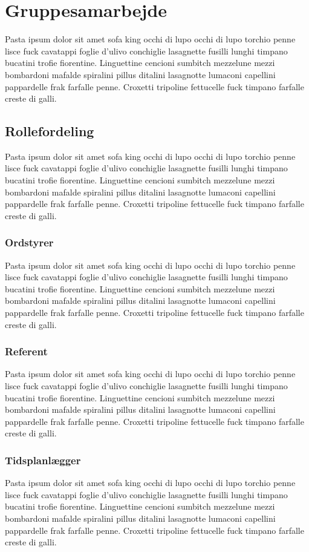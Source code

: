 \chapter{Gruppesamarbejde}
Pasta ipsum dolor sit amet sofa king occhi di lupo occhi di lupo torchio penne lisce fuck cavatappi foglie d'ulivo conchiglie lasagnette fusilli lunghi timpano bucatini trofie fiorentine. Linguettine cencioni sumbitch mezzelune mezzi bombardoni mafalde spiralini pillus ditalini lasagnotte lumaconi capellini pappardelle frak farfalle penne. Croxetti tripoline fettucelle fuck timpano farfalle creste di galli.

\section{Rollefordeling}
Pasta ipsum dolor sit amet sofa king occhi di lupo occhi di lupo torchio penne lisce fuck cavatappi foglie d'ulivo conchiglie lasagnette fusilli lunghi timpano bucatini trofie fiorentine. Linguettine cencioni sumbitch mezzelune mezzi bombardoni mafalde spiralini pillus ditalini lasagnotte lumaconi capellini pappardelle frak farfalle penne. Croxetti tripoline fettucelle fuck timpano farfalle creste di galli.

\subsection{Ordstyrer}
Pasta ipsum dolor sit amet sofa king occhi di lupo occhi di lupo torchio penne lisce fuck cavatappi foglie d'ulivo conchiglie lasagnette fusilli lunghi timpano bucatini trofie fiorentine. Linguettine cencioni sumbitch mezzelune mezzi bombardoni mafalde spiralini pillus ditalini lasagnotte lumaconi capellini pappardelle frak farfalle penne. Croxetti tripoline fettucelle fuck timpano farfalle creste di galli.

\subsection{Referent}
Pasta ipsum dolor sit amet sofa king occhi di lupo occhi di lupo torchio penne lisce fuck cavatappi foglie d'ulivo conchiglie lasagnette fusilli lunghi timpano bucatini trofie fiorentine. Linguettine cencioni sumbitch mezzelune mezzi bombardoni mafalde spiralini pillus ditalini lasagnotte lumaconi capellini pappardelle frak farfalle penne. Croxetti tripoline fettucelle fuck timpano farfalle creste di galli.

\subsection{Tidsplanlægger}
Pasta ipsum dolor sit amet sofa king occhi di lupo occhi di lupo torchio penne lisce fuck cavatappi foglie d'ulivo conchiglie lasagnette fusilli lunghi timpano bucatini trofie fiorentine. Linguettine cencioni sumbitch mezzelune mezzi bombardoni mafalde spiralini pillus ditalini lasagnotte lumaconi capellini pappardelle frak farfalle penne. Croxetti tripoline fettucelle fuck timpano farfalle creste di galli.

